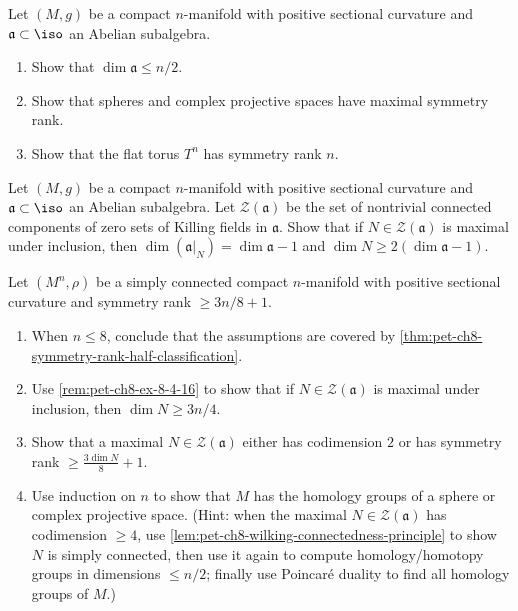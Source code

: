 \begin{remark}
  \label{rem:pet-ch8-ex-8-4-15}
  Let $(M,g)$ be a compact $n$-manifold with positive sectional curvature and
  $\mathfrak a\subset\iso$ an Abelian subalgebra.
  \begin{enumerate}
    \item Show that $\dim\mathfrak a\le n/2$.
    \item Show that spheres and complex projective spaces have maximal
      symmetry rank.
    \item Show that the flat torus $T^n$ has symmetry rank $n$.
  \end{enumerate}
\end{remark}

\begin{remark}
  \label{rem:pet-ch8-ex-8-4-16}
  Let $(M,g)$ be a compact $n$-manifold with positive sectional curvature and
  $\mathfrak a\subset\iso$ an Abelian subalgebra. Let $\mathcal Z(\mathfrak a)$
  be the set of nontrivial connected components of zero sets of Killing fields
  in $\mathfrak a$. Show that if $N\in\mathcal Z(\mathfrak a)$ is maximal under
  inclusion, then $\dim(\mathfrak a|_N)=\dim\mathfrak a-1$ and
  $\dim N\ge2(\dim\mathfrak a-1)$.
\end{remark}

\begin{remark}
  \label{rem:pet-ch8-ex-8-4-17}
  Let $(M^n,\rho)$ be a simply connected compact $n$-manifold with positive
  sectional curvature and symmetry rank $\ge3n/8+1$.
  \begin{enumerate}
    \item When $n\le8$, conclude that the assumptions are covered by
      \cref{thm:pet-ch8-symmetry-rank-half-classification}.
    \item Use \cref{rem:pet-ch8-ex-8-4-16} to show that if
      $N\in\mathcal Z(\mathfrak a)$ is maximal under inclusion, then
      $\dim N\ge3n/4$.
    \item Show that a maximal $N\in\mathcal Z(\mathfrak a)$ either has
      codimension $2$ or has symmetry rank $\ge\tfrac{3\dim N}8+1$.
    \item Use induction on $n$ to show that $M$ has the homology groups of a
      sphere or complex projective space. (Hint: when the maximal
      $N\in\mathcal Z(\mathfrak a)$ has codimension $\ge4$, use
      \cref{lem:pet-ch8-wilking-connectedness-principle} to show $N$ is simply
      connected, then use it again to compute homology/homotopy groups in
      dimensions $\le n/2$; finally use Poincar\'e duality to find all
      homology groups of $M$.)
  \end{enumerate}
\end{remark}

